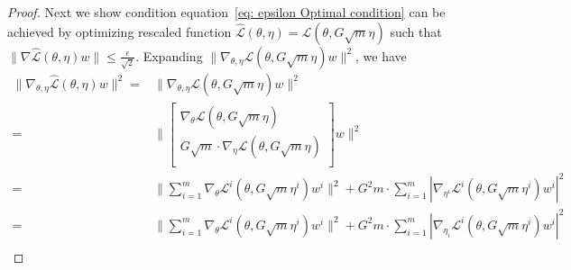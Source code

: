 \documentclass[twoside]{article} %
\def\eqref#1{equation~\ref{#1}}
\theoremstyle{plain}
\theoremstyle{definition}
\theoremstyle{remark}
\newcommand{\fL}{\mathcal{L}}
\newcommand{\fhL}{\hat{\mathcal{L}}}
\begin{document}
\begin{proof}
Next we show condition \eqref{eq: epsilon Optimal condition} can be achieved by optimizing rescaled function $\fhL(\theta, \eta)=\fL({\theta}, G{\sqrt{m}}{\eta})$ such that $\|\nabla \fhL(\theta,\eta)w\|\leq \frac{\epsilon}{\sqrt{2}}$. Expanding $\|\nabla_{{\theta}, {\eta}}\fL({\theta}, G{\sqrt{m}}{\eta})w \|^2$, we have
\begin{align}
    \|\nabla_{{\theta}, {\eta}}\fhL({\theta}, {\eta}){w}\|^2=
    &\|\nabla_{{\theta}, {\eta}}\fL({\theta}, G{\sqrt{m}}{\eta}){w} \|^2\nonumber \\
    =&\Big\| \begin{bmatrix}
        \nabla_{{\theta}}\fL({\theta}, G\sqrt{m} {\eta})\\
        G\sqrt{m}\cdot\nabla_{{\eta}} \fL({\theta}, G\sqrt{m} {\eta})\\
    \end{bmatrix} {w} \Big\|^2 \nonumber\\
    =&\|\sum_{i=1}^{m}\nabla_{{\theta}}\fL^i({\theta},G\sqrt{m}\eta^i)w^i\|^2 +G^2m\cdot\sum_{i=1}^{m}|\nabla_{\eta^i}\fL^i({\theta}, G\sqrt{m} \eta^i){w^i}|^2\nonumber \\
    =&\|\sum_{i=1}^{m}\nabla_{{\theta}}\fL^i({\theta},G\sqrt{m}\eta^i)w^i\|^2 +G^2m\cdot\sum_{i=1}^{m}|\nabla_{\eta_i}\fL^i({\theta}, G\sqrt{m} \eta^i){w^i}|^2\nonumber \\

\end{align}
\end{proof}
\end{document}
